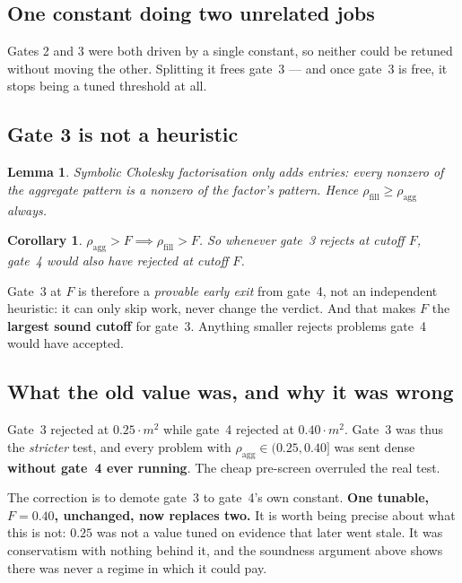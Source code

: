 \documentclass[11pt]{article}
\newtheorem{lemma}{Lemma}
\newtheorem{corollary}{Corollary}
\newcommand{\aggr}{\rho_{\mathrm{agg}}}
\newcommand{\rfill}{\rho_{\mathrm{fill}}}
\begin{document}
\subsection{One constant doing two unrelated jobs}

Gates 2 and 3 were both driven by a single constant, so neither could be retuned without moving the
other. Splitting it frees gate~3 --- and once gate~3 is free, it stops being a tuned threshold at
all.

\subsection{Gate 3 is not a heuristic}

\begin{lemma}
Symbolic Cholesky factorisation only \emph{adds} entries: every nonzero of the aggregate pattern is
a nonzero of the factor's pattern. Hence $\rfill \ge \aggr$ always.
\end{lemma}

\begin{corollary}
$\aggr > F \implies \rfill > F$. So whenever gate~3 rejects at cutoff $F$, gate~4 would also have
rejected at cutoff $F$.
\end{corollary}

Gate~3 at $F$ is therefore a \emph{provable early exit} from gate~4, not an independent heuristic:
it can only skip work, never change the verdict. And that makes $F$ the \textbf{largest sound
cutoff} for gate~3. Anything smaller rejects problems gate~4 would have accepted.

\subsection{What the old value was, and why it was wrong}

Gate~3 rejected at $0.25 \cdot m^2$ while gate~4 rejected at $0.40 \cdot m^2$. Gate~3 was thus the
\emph{stricter} test, and every problem with $\aggr \in (0.25, 0.40]$ was sent dense
\textbf{without gate~4 ever running}. The cheap pre-screen overruled the real test.

The correction is to demote gate~3 to gate~4's own constant. \textbf{One tunable, $F = 0.40$,
unchanged, now replaces two.} It is worth being precise about what this is not: $0.25$ was not a
value tuned on evidence that later went stale. It was conservatism with nothing behind it, and the
soundness argument above shows there was never a regime in which it could pay.
\end{document}
